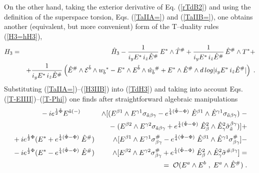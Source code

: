 \documentclass[a4paper,11pt]{article}
\begin{document}
On the other hand, taking the exterior derivative of Eq. (\ref{rTdB2}) 
and using the definition of the superspace 
torsion, Eqs.  (\ref{TaIIA=}) and (\ref{TaIIB=}), 
one obtains another (equivalent, but more convenient) 
form  of the T--duality rules (\ref{H3=hH3}), 
\begin{eqnarray}
\label{TdH3} &
H_3 = & \hat{H}_3 
- {1\over i_{y}{E}^{ {*}}\, i_{\hat{z}}\hat{E}^{ {\#}}}
\, E^{ {*}} \wedge \hat{T}^{ {\# }}  
+ {1\over i_{y}{E}^{ {*}}\, i_{\hat{z}}\hat{E}^{ {\#}}}
\, \hat{E}^{ {\#}} \wedge {T}^{ {*}} + \\ 
\nonumber 
 & & + 
{1\over i_{y}{E}^{ {*}}\, i_{\hat{z}}\hat{E}^{ {\#}}}
\left( \hat{E}^{ {\#}} \wedge 
{\cal E}^{ {\tilde{b}}}\wedge 
{w}_{ {\tilde{b}}}{}^{ {*}}
-  {E}^{ {*}} \wedge 
{E}^{ {\tilde{b}}}\wedge \hat{w}_{ {\tilde{b}}}
{}^{ {\#}} +  {E}^{ {*}} \wedge 
\hat{E}^{ {\#}}\wedge d\, 
log|i_{y}{E}^{ {*}}\, i_{\hat{z}}\hat{E}^{ {\#}}|\right) 
\; .
\end{eqnarray}
Substituting 
(\ref{TaIIA=})--(\ref{H3IIB}) 
into (\ref{TdH3}) and taking into account 
Eqs. (\ref{T-EIIII})--(\ref{T-Phi})  
one finds after straightforward algebraic manipulations  
\begin{eqnarray}\label{hH3II2}
 & {}  
\qquad {} 
\qquad  - i e^{{1\over 2}\hat{\Phi}} 
{E}^{ {\tilde{a}}(-)}
& \wedge [ 
({E}^{ {\beta}1}\wedge {E}^{ {\gamma}1} 
\sigma_{  {\tilde{a}} {\beta} {\gamma}} - 
 e^{{1\over 4}(\hat{\Phi}- {\Phi})}\; 
\hat{E}^{ {\beta}1}\wedge \hat{E}^{ {\gamma}1} 
\sigma_{  {\tilde{a}} {\beta} {\gamma}}) \; 
- \\ & & \nonumber 
- \; ({E}^{ {\beta}2}\wedge {E}^{ {\gamma}2} 
\sigma_{  {\tilde{a}} {\beta} {\gamma}} 
+  e^{{1\over 4}(\hat{\Phi}- {\Phi})}\;
\hat{E}_{ {\beta}}^2\wedge \hat{E}_{ {\gamma}}^2  
\tilde{\sigma}_{ {\tilde{a}}}
^{ {\beta} {\gamma}})] + 
\\ & \nonumber 
+ i e^{{1\over 2}{\Phi}}  
({E}^{ {*}}  + e^{{1\over 4}(\hat{\Phi}- {\Phi})}\; 
\hat{E}^{ {\#}}) 
& \wedge [{E}^{ {\beta}1}\wedge {E}^{ {\gamma}1} 
\sigma^{  {\#}}_{ {\beta} {\gamma}} 
- e^{{1\over 4}(\hat{\Phi}- {\Phi})}\; 
\hat{E}^{ {\beta}1}\wedge \hat{E}^{ {\gamma}1} 
\sigma^{  {\#}}_{ {\beta} {\gamma}}] 
- \\ &  
\nonumber -  i e^{{1\over 2}{\Phi}}  
({E}^{ {*}}  - e^{{1\over 4}(\hat{\Phi}- {\Phi})}\; 
\hat{E}^{ {\#}}) 
& \wedge [{E}^{ {\beta}2}\wedge {E}^{ {\gamma}2} 
\sigma^{  {\#}}_{ {\beta} {\gamma}} 
+ e^{{1\over 4}(\hat{\Phi}- {\Phi})} \;
\hat{E}_{ {\beta}}^2\wedge \hat{E}_{ {\gamma}}^2  
\tilde{\sigma}^{ {\#} {\beta} {\gamma}}] =
\\ & & 
\nonumber   {}\qquad {} \qquad {} 
\qquad  = \; {\cal O} (
{E}^{ {a}}\wedge {E}^{ {b}}\; ,\;  
{E}^{ {a}}\wedge \hat{E}^{ {\#}})\; . 
\end{eqnarray}
\end{document}
